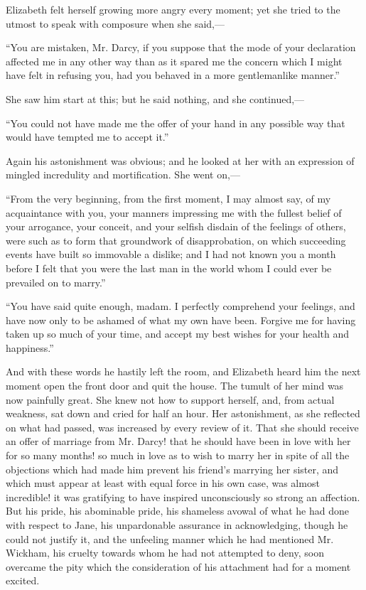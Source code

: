 Elizabeth felt herself growing more angry every moment; yet she tried to the utmost to speak with composure when she said,---

``You are mistaken, Mr. Darcy, if you suppose that the mode of your declaration affected me in any other way than as it spared me the concern which I might have felt in refusing you, had you behaved in a more gentlemanlike manner.''

She saw him start at this; but he said nothing, and she continued,---

``You could not have made me the offer of your hand in any possible way that would have tempted me to accept it.''

Again his astonishment was obvious; and he looked at her with an expression of mingled incredulity and mortification. She went on,---

``From the very beginning, from the first moment, I may almost say, of my acquaintance with you, your manners impressing me with the fullest belief of your arrogance, your conceit, and your selfish disdain of the feelings of others, were such as to form that groundwork of disapprobation, on which succeeding events have built so immovable a dislike; and I had not known you a month before I felt that you were the last man in the world whom I could ever be prevailed on to marry.''

``You have said quite enough, madam. I perfectly comprehend your feelings, and have now only to be ashamed of what my own have been. Forgive me for having taken up so much of your time, and accept my best wishes for your health and happiness.''

And with these words he hastily left the room, and Elizabeth heard him the next moment open the front door and quit the house. The tumult of her mind was now painfully great. She knew not how to support herself, and, from actual weakness, sat down and cried for half an hour. Her astonishment, as she reflected on what had passed, was increased by every review of it. That she should receive an offer of marriage from Mr. Darcy! that he should have been in love with her for so many months! so much in love as to wish to marry her in spite of all the objections which had made him prevent his friend's marrying her sister, and which must appear at least with equal force in his own case, was almost incredible! it was gratifying to have inspired unconsciously so strong an affection. But his pride, his abominable pride, his shameless avowal of what he had done with respect to Jane, his unpardonable assurance in acknowledging, though he could not justify it, and the unfeeling manner which he had mentioned Mr. Wickham, his cruelty towards whom he had not attempted to deny, soon overcame the pity which the consideration of his attachment had for a moment excited.

